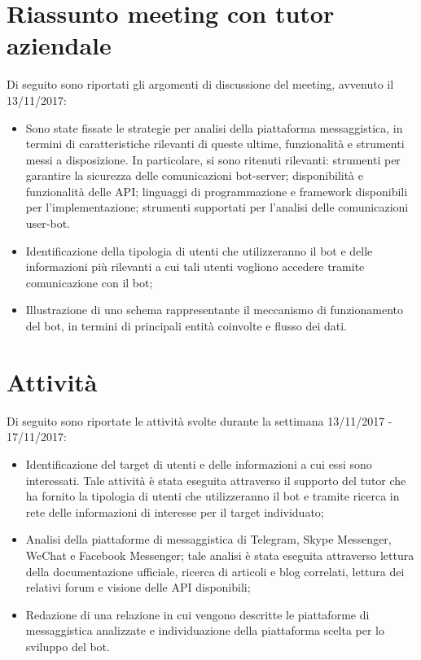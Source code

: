 \documentclass[11pt,notitlepage]{article}
\begin{document}
\section*{Riassunto meeting con tutor aziendale}
Di seguito sono riportati gli argomenti di discussione del meeting, avvenuto il 13/11/2017:
\begin{itemize}
		\item Sono state fissate le strategie per analisi della piattaforma messaggistica, in termini di caratteristiche rilevanti di queste ultime, funzionalità e strumenti messi a disposizione. In particolare, si sono ritenuti rilevanti: strumenti per garantire la sicurezza delle comunicazioni bot-server; disponibilità e funzionalità delle API; linguaggi di programmazione e framework disponibili per l'implementazione; strumenti supportati per l'analisi delle comunicazioni user-bot.
		\item Identificazione della tipologia di utenti che utilizzeranno il bot e delle informazioni più rilevanti a cui tali utenti vogliono accedere tramite comunicazione con il bot; 
		\item Illustrazione di uno schema rappresentante il meccanismo di funzionamento del bot, in termini di principali entità coinvolte e flusso dei dati.
\end{itemize} 




\bigskip
\section*{Attività}
Di seguito sono riportate le attività svolte durante la settimana 13/11/2017 - 17/11/2017:
\begin{itemize}
		\item Identificazione del target di utenti e delle informazioni a cui essi sono interessati. Tale attività è stata eseguita attraverso il supporto del tutor che ha fornito la tipologia di utenti che utilizzeranno il bot e tramite ricerca in rete delle informazioni di interesse per il target individuato;
		\item Analisi della piattaforme di messaggistica di Telegram, Skype Messenger, WeChat e Facebook Messenger; tale analisi è stata eseguita attraverso lettura della documentazione ufficiale, ricerca di articoli e blog correlati, lettura dei relativi forum e visione delle API disponibili;
		\item Redazione di una relazione in cui vengono descritte le piattaforme di messaggistica analizzate e individuazione della piattaforma scelta per lo sviluppo del bot. 
\end{itemize}


\end{document}
